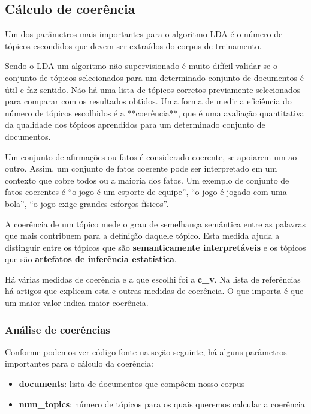 \subsection{Cálculo de coerência}

Um dos parâmetros mais importantes para o algoritmo LDA é o número de tópicos escondidos que devem ser extraídos do corpus de treinamento.

Sendo o LDA um algoritmo não supervisionado é muito difícil validar se o conjunto de tópicos selecionados para um determinado conjunto de documentos
é útil e faz sentido. Não há uma lista de tópicos corretos previamente selecionados para comparar com os resultados obtidos. Uma forma de medir a 
eficiência do número de tópicos escolhidos é a **coerência**, que é uma avaliação quantitativa da qualidade dos tópicos aprendidos para um determinado 
conjunto de documentos.

Um conjunto de afirmações ou fatos é considerado coerente, se apoiarem um ao outro. Assim, um conjunto de fatos coerente pode ser interpretado 
em um contexto que cobre todos ou a maioria dos fatos. Um exemplo de conjunto de fatos coerentes é “o jogo é um esporte de equipe”, 
“o jogo é jogado com uma bola”, “o jogo exige grandes esforços físicos”.

A coerência de um tópico mede o grau de semelhança semântica entre as palavras que mais contribuem para a definição daquele tópico.
Esta medida ajuda a distinguir entre os tópicos que são \textbf{semanticamente interpretáveis} e os tópicos que são 
\textbf{artefatos de inferência estatística}.

Há várias medidas de coerência e a que escolhi foi a \textbf{c\_v}. Na lista de referências há artigos que explicam esta e outras 
medidas de coerência. O que importa é que um maior valor indica maior coerência.

\subsubsection{Análise de coerências}

Conforme podemos ver código fonte na seção seguinte, há alguns parâmetros importantes para o cálculo da coerência:

\begin{itemize}
    \item \textbf{documents}: lista de documentos que compôem nosso corpus
    \item \textbf{num\_topics}: número de tópicos para os quais queremos calcular a coerência
\end{itemize}

